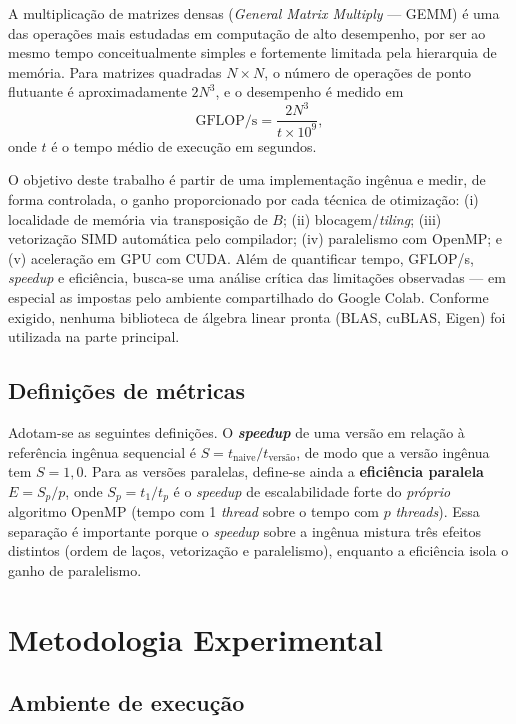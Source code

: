 \documentclass{sbc2023}%
\begin{document}
A multiplicação de matrizes densas (\textit{General Matrix Multiply} --- GEMM) é uma das operações mais estudadas em computação de alto desempenho, por ser ao mesmo tempo conceitualmente simples e fortemente limitada pela hierarquia de memória. Para matrizes quadradas $N \times N$, o número de operações de ponto flutuante é aproximadamente $2N^3$, e o desempenho é medido em
\begin{equation}\label{eq:gflops}
\text{GFLOP/s} = \frac{2N^3}{t \times 10^{9}},
\end{equation}
onde $t$ é o tempo médio de execução em segundos.

O objetivo deste trabalho é partir de uma implementação ingênua e medir, de forma controlada, o ganho proporcionado por cada técnica de otimização: (i) localidade de memória via transposição de $B$; (ii) blocagem/\textit{tiling}; (iii) vetorização SIMD automática pelo compilador; (iv) paralelismo com OpenMP; e (v) aceleração em GPU com CUDA. Além de quantificar tempo, GFLOP/s, \textit{speedup} e eficiência, busca-se uma análise crítica das limitações observadas --- em especial as impostas pelo ambiente compartilhado do Google Colab. Conforme exigido, nenhuma biblioteca de álgebra linear pronta (BLAS, cuBLAS, Eigen) foi utilizada na parte principal.

\subsection{Definições de métricas}

Adotam-se as seguintes definições. O \textbf{\textit{speedup}} de uma versão em relação à referência ingênua sequencial é $S = t_{\text{naive}} / t_{\text{versão}}$, de modo que a versão ingênua tem $S = 1{,}0$. Para as versões paralelas, define-se ainda a \textbf{eficiência paralela} $E = S_p / p$, onde $S_p = t_{1}/t_{p}$ é o \textit{speedup} de escalabilidade forte do \emph{próprio} algoritmo OpenMP (tempo com 1 \textit{thread} sobre o tempo com $p$ \textit{threads}). Essa separação é importante porque o \textit{speedup} sobre a ingênua mistura três efeitos distintos (ordem de laços, vetorização e paralelismo), enquanto a eficiência isola o ganho de paralelismo.


\section{Metodologia Experimental}
\label{sec:metodo}

\subsection{Ambiente de execução}
\end{document}
